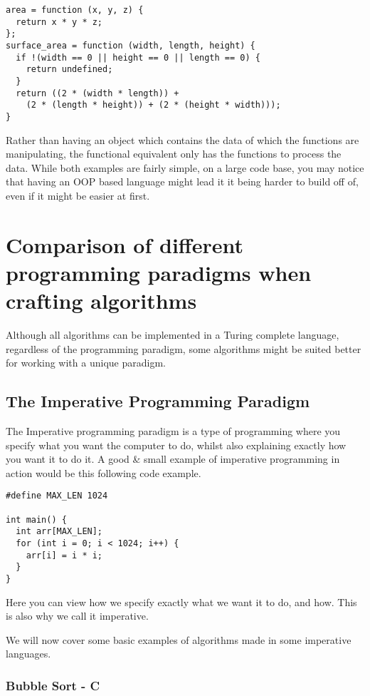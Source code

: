 \documentclass{report}
\begin{document}
\begin{lstlisting}
area = function (x, y, z) {
  return x * y * z;
};
surface_area = function (width, length, height) {
  if !(width == 0 || height == 0 || length == 0) {
    return undefined;
  }
  return ((2 * (width * length)) + 
    (2 * (length * height)) + (2 * (height * width)));
}
\end{lstlisting}

Rather than having an object which contains the data of which the functions are manipulating, the functional equivalent only has the functions to process the data. While both examples are fairly simple, on a large code base, you may notice that having an OOP based language might lead it it being harder to build off of, even if it might be easier at first.


\chapter{Comparison of different programming paradigms when crafting algorithms}
Although all algorithms can be implemented in a Turing complete language, regardless of the programming paradigm, some algorithms might be suited better for working with a unique paradigm.
\section{The Imperative Programming Paradigm}
The Imperative programming paradigm is a type of programming where you specify what you want the computer to do, whilst also explaining exactly how you want it to do it. A good \& small example of imperative programming in action would be this following code example.
\begin{lstlisting}
#define MAX_LEN 1024

int main() {
  int arr[MAX_LEN];
  for (int i = 0; i < 1024; i++) {
    arr[i] = i * i;
  }
}
\end{lstlisting}
Here you can view how we specify exactly what we want it to do, and how. This is also why we call it imperative.

We will now cover some basic examples of algorithms made in some imperative languages.

\subsection{Bubble Sort - C} %
\end{document}
